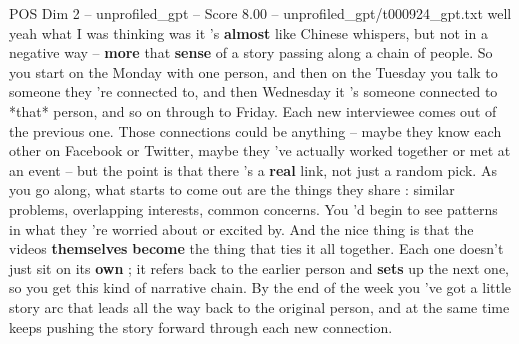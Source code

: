 \begin{textsample}{POS Dim 2 – unprofiled\_gpt – Score 8.00 – unprofiled\_gpt/t000924\_gpt.txt}  \label{ex:f2_pos_024}
well yeah what I was thinking was it ’s \textbf{almost} like Chinese whispers, but not in a negative way – \textbf{more} that \textbf{sense} of a story passing along a chain of people.
So you start on the Monday with one person, and then on the Tuesday you talk to someone they ’re connected to, and then Wednesday it ’s someone connected to *that* person, and so on through to Friday.
Each new interviewee comes out of the previous one.
Those connections could be anything – maybe they know each other on Facebook or Twitter, maybe they ’ve actually worked together or met at an event – but the point is that there ’s a \textbf{real} link, not just a random pick.
As you go along, what starts to come out are the things they share : similar problems, overlapping interests, common concerns.
You ’d begin to see patterns in what they ’re worried about or excited by.
And the nice thing is that the videos \textbf{themselves} \textbf{become} the thing that ties it all together.
Each one doesn't just sit on its \textbf{own} ; it refers back to the earlier person and \textbf{sets} up the next one, so you get this kind of narrative chain.
By the end of the week you ’ve got a little story arc that leads all the way back to the original person, and at the same time keeps pushing the story forward through each new connection.

\end{textsample}
